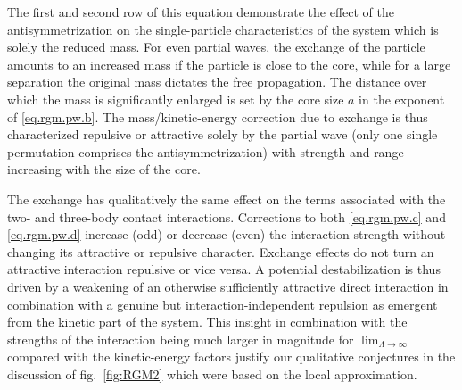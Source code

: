 \documentclass[onecolumn,preprint,superscriptaddress,nofootinbib,notitlepage,10pt,linenumbers]{revtex4-1}
\newcommand{\toinf}{\ensuremath{\stackrel{\text{\scalebox{0.6}{$\Lambda\to\infty$}}}{\longrightarrow}}}
\newcommand{\figref}[1]{fig.~\ref{#1}}
\begin{document}
%
The first and second row of this equation demonstrate the effect of the antisymmetrization on the single-particle
characteristics of the system which is solely the reduced mass. For even partial waves, the exchange of the particle
amounts to an increased mass if the particle is close to the core, while for a large separation the original
mass dictates the free propagation. The distance over which the mass is significantly enlarged is set by the
core size $a$ in the exponent of \eqref{eq.rgm.pw.b}. The mass/kinetic-energy correction due to exchange is thus
characterized repulsive or attractive solely by the partial wave (only one single permutation comprises the 
antisymmetrization) with strength and range increasing with the size of the core.

The exchange has qualitatively the same effect on the terms associated with the two- and three-body contact interactions.
Corrections to both \eqref{eq.rgm.pw.c} and \eqref{eq.rgm.pw.d} increase (odd) or decrease (even) the interaction
strength without changing its attractive or repulsive character. Exchange effects do not turn an attractive interaction
repulsive or vice versa. A potential destabilization is thus driven by a weakening of an otherwise sufficiently attractive 
direct interaction in combination with a genuine but interaction-independent repulsion as emergent from the
kinetic part of the system. This insight in combination with the strengths of the interaction being
much larger in magnitude for $\lim_{\Lambda\to\infty}$ compared with the kinetic-energy factors justify our qualitative
conjectures in the discussion of \figref{fig:RGM2} which were based on the local approximation.


\end{document}
